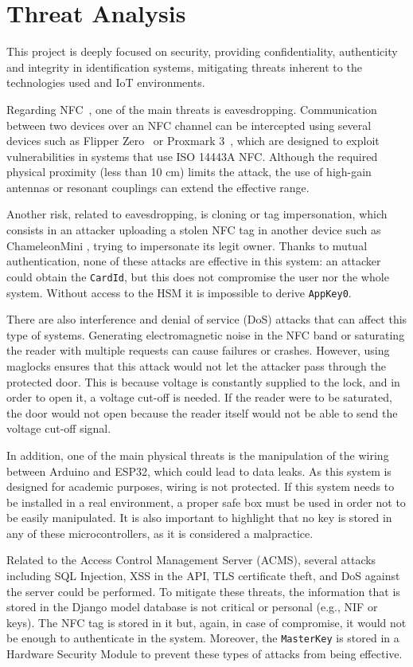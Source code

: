 \section{Threat Analysis}
\label{sec:threat_analysis}

This project is deeply focused on security, providing confidentiality, authenticity and integrity in identification systems, mitigating threats inherent to the technologies used and IoT environments.

Regarding NFC~\cite{Ref54}, one of the main threats is eavesdropping. Communication between two devices over an NFC channel can be intercepted using several devices such as Flipper Zero~\cite{Ref51} or Proxmark 3~\cite{Ref55}, which are designed to exploit vulnerabilities in systems that use ISO 14443A NFC. Although the required physical proximity (less than 10 cm) limits the attack, the use of high-gain antennas or resonant couplings can extend the effective range.

Another risk, related to eavesdropping, is cloning or tag impersonation, which consists in an attacker uploading a stolen NFC tag in another device such as ChameleonMini \cite{Ref57}, trying to impersonate its legit owner. Thanks to mutual authentication, none of these attacks are effective in this system: an attacker could obtain the \texttt{CardId}, but this does not compromise the user nor the whole system. Without access to the HSM it is impossible to derive \texttt{AppKey0}.

There are also interference and denial of service (DoS) attacks that can affect this type of systems. Generating electromagnetic noise in the NFC band or saturating the reader with multiple requests can cause failures or crashes. However, using maglocks ensures that this attack would not let the attacker pass through the protected door. This is because voltage is constantly supplied to the lock, and in order to open it, a voltage cut-off is needed. If the reader were to be saturated, the door would not open because the reader itself would not be able to send the voltage cut-off signal.

In addition, one of the main physical threats is the manipulation of the wiring between Arduino and ESP32, which could lead to data leaks. As this system is designed for academic purposes, wiring is not protected. If this system needs to be installed in a real environment, a proper safe box must be used in order not to be easily manipulated. It is also important to highlight that no key is stored in any of these microcontrollers, as it is considered a malpractice.

Related to the Access Control Management Server (ACMS), several attacks including SQL Injection, XSS in the API, TLS certificate theft, and DoS against the server could be performed. To mitigate these threats, the information that is stored in the Django model database is not critical or personal (e.g., NIF or keys). The NFC tag is stored in it but, again, in case of compromise, it would not be enough to authenticate in the system. Moreover, the \texttt{MasterKey} is stored in a Hardware Security Module to prevent these types of attacks from being effective.

